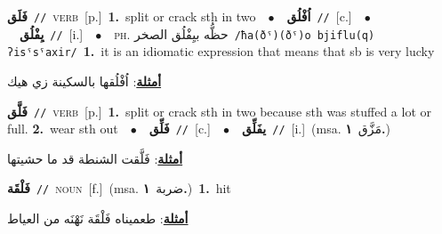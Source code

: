 \documentclass[10pt,a4paper,twoside]{article} %
\begin{document}
\begin{multicols}{2}
{\setlength\topsep{0pt}\textbf{\foreignlanguage{arabic}{فَلَق}}\ {\color{gray}\texttt{//}\color{black}}\ \textsc{verb}\ [p.]\ \textbf{1.}~split or crack sth in two\ \ $\bullet$\ \ \setlength\topsep{0pt}\textbf{\foreignlanguage{arabic}{اُفْلُق}}\ {\color{gray}\texttt{//}\color{black}}\ [c.]\ \ $\bullet$\ \ \setlength\topsep{0pt}\textbf{\foreignlanguage{arabic}{يِفْلُق}}\ {\color{gray}\texttt{//}\color{black}}\ [i.]\ \ $\bullet$\ \ \textsc{ph.} \color{gray} \foreignlanguage{arabic}{حظُّه بيِفْلُق الصخر}\color{black}\ {\color{gray}\texttt{/{\sffamily ħa(ðˤ)(ðˤ)o bjiflu(q) ʔisˤsˤaxir}/}\color{black}}\ \textbf{1.}~it is an idiomatic expression that means that sb is very lucky\  \begin{flushright}\color{gray}\foreignlanguage{arabic}{\textbf{\underline{\foreignlanguage{arabic}{أمثلة}}}: اُفْلُقها بالسكينة زي هيك}\end{flushright}\color{black}} \vspace{2mm}

{\setlength\topsep{0pt}\textbf{\foreignlanguage{arabic}{فَلَّق}}\ {\color{gray}\texttt{//}\color{black}}\ \textsc{verb}\ [p.]\ \textbf{1.}~split or crack sth in two because sth was stuffed a lot or full.  \textbf{2.}~wear sth out\ \ $\bullet$\ \ \setlength\topsep{0pt}\textbf{\foreignlanguage{arabic}{فَلِّق}}\ {\color{gray}\texttt{//}\color{black}}\ [c.]\ \ $\bullet$\ \ \setlength\topsep{0pt}\textbf{\foreignlanguage{arabic}{يفَلِّق}}\ {\color{gray}\texttt{//}\color{black}}\ [i.]\ \color{gray}(msa. \foreignlanguage{arabic}{مَزَّق}~\foreignlanguage{arabic}{\textbf{١.}})\color{black}\  \begin{flushright}\color{gray}\foreignlanguage{arabic}{\textbf{\underline{\foreignlanguage{arabic}{أمثلة}}}: فَلَّقت الشنطة قد ما حشيتها}\end{flushright}\color{black}} \vspace{2mm}

{\setlength\topsep{0pt}\textbf{\foreignlanguage{arabic}{فَلْقَة}}\ {\color{gray}\texttt{//}\color{black}}\ \textsc{noun}\ [f.]\ \color{gray}(msa. \foreignlanguage{arabic}{ضربة}~\foreignlanguage{arabic}{\textbf{١.}})\color{black}\ \textbf{1.}~hit\  \begin{flushright}\color{gray}\foreignlanguage{arabic}{\textbf{\underline{\foreignlanguage{arabic}{أمثلة}}}: طعميناه فَلْقَة نَهْنَه من العياط}\end{flushright}\color{black}} \vspace{2mm}


\end{multicols}
\end{document}
